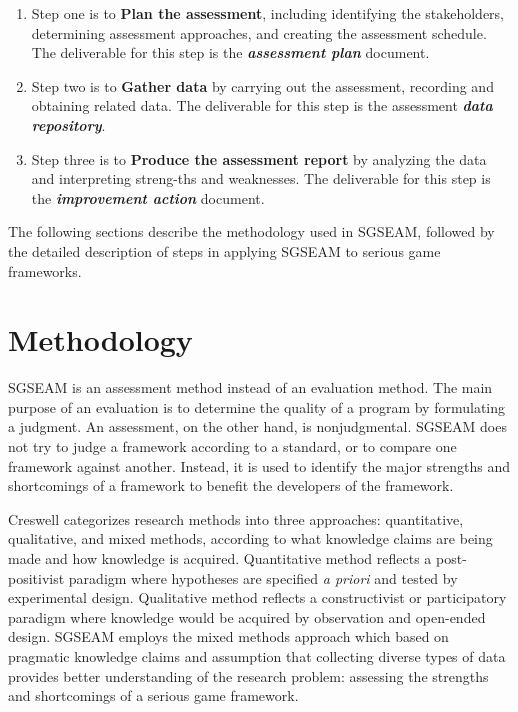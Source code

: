 \begin{enumerate}
\item Step one is to {\bf Plan the assessment}, including
 identifying the stakeholders, determining assessment approaches, and creating the assessment schedule. 
 The deliverable for this step is the \textbf{\textit{assessment
     plan}} document. 

\item Step two is to {\bf Gather data} by carrying out 
 the assessment, recording and obtaining related data. The deliverable for this step is the 
 assessment \textbf{\textit{data repository}}. 

\item Step three is to {\bf Produce the assessment report} by analyzing 
 the data and interpreting streng-ths and weaknesses. The deliverable
 for this step is the \textbf{\textit{improvement action}} document.

\end{enumerate}
 
The following sections describe the methodology used in SGSEAM, followed by the detailed
description of steps in applying SGSEAM to serious game frameworks.

\section{Methodology}

SGSEAM is an assessment method instead of an evaluation method. The main purpose 
of an evaluation is to determine the quality of a program by formulating a judgment. An assessment, on 
the other hand, is nonjudgmental. SGSEAM does not try to judge a framework according to a 
standard, or to compare one framework against another. Instead, it is used to identify the major 
strengths and shortcomings of a framework to benefit  the developers of the framework.

Creswell \cite{creswell2003} categorizes research methods into three approaches:
quantitative, qualitative, and mixed methods, according to what knowledge claims are being made
and how knowledge is acquired. Quantitative method reflects a post-positivist paradigm where
hypotheses are specified {\em a priori} and tested by experimental design. Qualitative method
reflects a constructivist or participatory paradigm where knowledge would be acquired by
observation and open-ended design. SGSEAM employs the mixed methods approach which based on
pragmatic knowledge claims and assumption that collecting diverse types of data provides better
understanding of the research problem: assessing the strengths and shortcomings of a serious game
framework.


